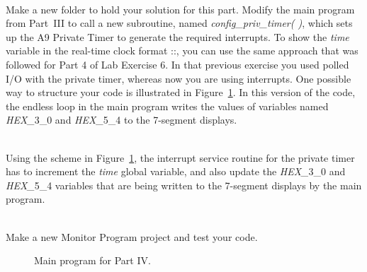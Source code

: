 \documentclass[epsfig,10pt,fullpage]{article}
\newcommand{\CommonDocsPath}{../../../../common/docs}
\begin{document}
~\\
\noindent
Make a new folder to hold your solution for this part. Modify the main
program from Part~III to call a new subroutine, named {\it config\_priv\_timer( )}, which 
sets up the
A9 Private Timer to generate the required interrupts. To show the {\it time} variable in
the real-time clock format ::, you can use the same approach that was
followed for Part 4 of Lab Exercise 6. In that previous exercise you used polled I/O with
the private timer, whereas now you are using interrupts. One possible way to structure
your code is illustrated in Figure~\ref{fig:code3}. In this version of the code, the 
endless loop in the main program writes the values of variables named {\it HEX\_}3\_0
and {\it HEX\_}5\_4 to the 7-segment displays. 

~\\
\noindent
Using the scheme in Figure~\ref{fig:code3}, the interrupt service routine for the private 
timer has to increment the {\it time} global variable, and also update  
the {\it HEX\_}3\_0 and {\it HEX\_}5\_4 variables that are being written to the 
7-segment displays by the main program.

~\\
\noindent
Make a new Monitor Program project and test your code. 

\begin{figure}[H]
\begin{center}

\end{center}
\vspace{-0.5cm}\caption{Main program for Part IV.}
\label{fig:code3}
\end{figure}




\end{document}
